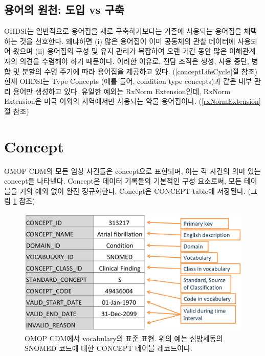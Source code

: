 \documentclass[11pt]{book}
\theoremstyle{definition}
\theoremstyle{definition}
\theoremstyle{definition}
\theoremstyle{remark}
\begin{document}
\subsection{용어의 원천: 도입 vs 구축}\label{---vs-}

OHDSI는 일반적으로 용어집을 새로 구축하기보다는 기존에 사용되는 용어집을
채택하는 것을 선호한다. 왜냐하면 (i) 많은 용어집이 이미 공동체의 관찰
데이터에 사용되어 왔으며 (ii) 용어집의 구성 및 유지 관리가 복잡하여 오랜
기간 동안 많은 이해관계자의 의견을 수렴해야 하기 때문이다. 이러한
이유로, 전담 조직은 생성, 사용 중단, 병합 및 분할의 수명 주기에 따라
용어집을 제공하고 있다. (\ref{conceptLifeCycle}절 참조) 현재 OHDSI는
Type Concepts (예를 들어, condition type concepts)과 같은 내부 관리
용어만 생성하고 있다. 유일한 예외는 RxNorm Extension인데, RxNorm
Extension은 미국 이외의 지역에서만 사용되는 약물 용어집이다.
(\ref{rxNormExtension}절 참조)

\section{Concept}\label{concept}

OMOP CDM의 모든 임상 사건들은 concept으로 표현되며, 이는 각 사건의 의미
있는 concept을 나타낸다. Concept은 데이터 기록들의 기본적인 구성
요소로써, 모든 테이블을 거의 예외 없이 완전 정규화한다. Concept은
CONCEPT table에 저장된다. (그림 \ref{fig:concept} 참조) 

\begin{figure}

{\centering \includegraphics[width=0.9\linewidth]{images/StandardizedVocabularies/concept} 

}

\caption{OMOP CDM에서 vocabulary의 표준 표현. 위의 예는 심방세동의 SNOMED 코드에 대한 CONCEPT 테이블 레코드이다.}\label{fig:concept}
\end{figure}
\end{document}
